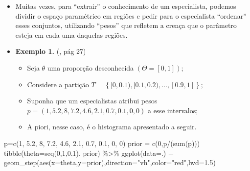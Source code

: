 \documentclass[
]{book}
\newenvironment{Shaded}{\begin{snugshade}}{\end{snugshade}}
\newcommand{\AttributeTok}[1]{\textcolor[rgb]{0.77,0.63,0.00}{#1}}
\newcommand{\DecValTok}[1]{\textcolor[rgb]{0.00,0.00,0.81}{#1}}
\newcommand{\FloatTok}[1]{\textcolor[rgb]{0.00,0.00,0.81}{#1}}
\newcommand{\FunctionTok}[1]{\textcolor[rgb]{0.00,0.00,0.00}{#1}}
\newcommand{\NormalTok}[1]{#1}
\newcommand{\OtherTok}[1]{\textcolor[rgb]{0.56,0.35,0.01}{#1}}
\newcommand{\SpecialCharTok}[1]{\textcolor[rgb]{0.00,0.00,0.00}{#1}}
\newcommand{\StringTok}[1]{\textcolor[rgb]{0.31,0.60,0.02}{#1}}
\providecommand{\tightlist}{%
  \setlength{\itemsep}{0pt}\setlength{\parskip}{0pt}}
\begin{document}
\begin{itemize}
\item
  Muitas vezes, para ``extrair'' o conhecimento de um especialista, podemos dividir o espaço paramétrico em regiões e pedir para o especialista ``ordenar'' esses conjuntos, utilizando ``pesos'' que refletem a crença que o parâmetro esteja em cada uma daquelas regiões.
\item
  \textbf{Exemplo 1.} (\citet{Albert09}, pág 27)

  \begin{itemize}
  \tightlist
  \item
    Seja \(\theta\) uma proporção desconhecida \((\Theta=[0,1])\);\\
  \item
    Considere a partição \(T = \left\{[0,0.1), [0.1,0.2), \ldots, [0.9,1] \right\}\);
  \item
    Suponha que um especialistas atribui pesos \(p=(1, 5.2, 8, 7.2, 4.6, 2.1, 0.7, 0.1, 0, 0)\) a esse intervalos;\\
  \item
    A piori, nesse caso, é o histograma apresentado a seguir.
  \end{itemize}
\end{itemize}

\begin{Shaded}
\begin{Highlighting}[]
\NormalTok{p}\OtherTok{=}\FunctionTok{c}\NormalTok{(}\DecValTok{1}\NormalTok{, }\FloatTok{5.2}\NormalTok{, }\DecValTok{8}\NormalTok{, }\FloatTok{7.2}\NormalTok{, }\FloatTok{4.6}\NormalTok{, }\FloatTok{2.1}\NormalTok{, }\FloatTok{0.7}\NormalTok{, }\FloatTok{0.1}\NormalTok{, }\DecValTok{0}\NormalTok{, }\DecValTok{0}\NormalTok{)}
\NormalTok{prior }\OtherTok{=} \FunctionTok{c}\NormalTok{(}\DecValTok{0}\NormalTok{,p}\SpecialCharTok{/}\NormalTok{(}\FunctionTok{sum}\NormalTok{(p)))}
\FunctionTok{tibble}\NormalTok{(}\AttributeTok{theta=}\FunctionTok{seq}\NormalTok{(}\DecValTok{0}\NormalTok{,}\DecValTok{1}\NormalTok{,}\FloatTok{0.1}\NormalTok{), prior) }\SpecialCharTok{\%\textgreater{}\%} 
  \FunctionTok{ggplot}\NormalTok{(}\AttributeTok{data=}\NormalTok{.) }\SpecialCharTok{+}
  \FunctionTok{geom\_step}\NormalTok{(}\FunctionTok{aes}\NormalTok{(}\AttributeTok{x=}\NormalTok{theta,}\AttributeTok{y=}\NormalTok{prior),}\AttributeTok{direction=}\StringTok{"vh"}\NormalTok{,}\AttributeTok{color=}\StringTok{"red"}\NormalTok{,}\AttributeTok{lwd=}\FloatTok{1.5}\NormalTok{)}
\end{Highlighting}
\end{Shaded}
\end{document}
